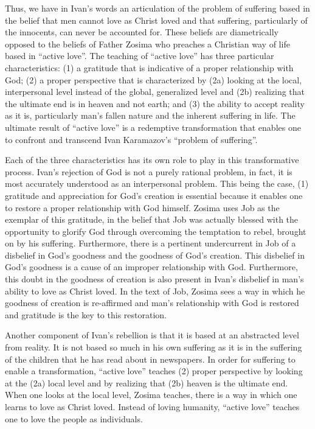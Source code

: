 Thus, we have in Ivan's words an articulation of the problem of suffering based in the belief that men cannot love as Christ loved and that suffering, particularly of the innocents, can never be accounted for. These beliefs are diametrically opposed to the beliefs of Father Zosima who preaches a Christian way of life based in ``active love''. The teaching of ``active love'' has three particular characteristics: (1) a gratitude that is indicative of a proper relationship with God; (2) a proper perspective that is characterized by (2a) looking at the local, interpersonal level instead of the global, generalized level and (2b) realizing that the ultimate end is in heaven and not earth; and (3) the ability to accept reality as it is, particularly man's fallen nature and the inherent suffering in life. The ultimate result of ``active love'' is a redemptive transformation that enables one to confront and transcend Ivan Karamazov's ``problem of suffering''.

Each of the three characteristics has its own role to play in this transformative process. Ivan's rejection of God is not a purely rational problem, in fact, it is most accurately understood as an interpersonal problem. This being the case, (1) gratitude and appreciation for God's creation is essential because it enables one to restore a proper relationship with God himself. Zosima uses Job as the exemplar of this gratitude, in the belief that Job was actually blessed with the opportunity to glorify God through overcoming the temptation to rebel, brought on by his suffering. Furthermore, there is a pertinent undercurrent in Job of a disbelief in God's goodness and the goodness of God's creation. This disbelief in God's goodness is a cause of an improper relationship with God. Furthermore, this doubt in the goodness of creation is also present in Ivan's disbelief in man's ability to love as Christ loved. In the text of Job, Zosima sees a way in which he goodness of creation is re-affirmed and man's relationship with God is restored and gratitude is the key to this restoration.

Another component of Ivan's rebellion is that it is based at an abstracted level from reality. It is not based so much in his own suffering as it is in the suffering of the children that he has read about in newspapers. In order for suffering to enable a transformation, ``active love'' teaches (2) proper perspective by looking at the (2a) local level and by realizing that (2b) heaven is the ultimate end. When one looks at the local level, Zosima teaches, there is a way in which one learns to love as Christ loved. Instead of loving humanity, ``active love'' teaches one to love the people as individuals.


